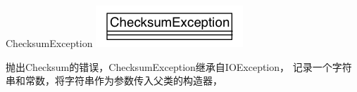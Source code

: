 \begin{XeClass}{ChecksumException}
\includegraphics[width=\textwidth]{cdig/ChecksumException.png}
     
 抛出Checksum的错误，ChecksumException继承自IOException，
 记录一个字符串和常数，将字符串作为参数传入父类的构造器，

\end{XeClass}
